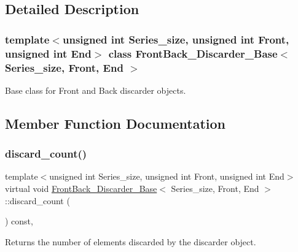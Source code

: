 \subsection{Detailed Description}
\subsubsection*{template$<$unsigned int Series\+\_\+size, unsigned int Front, unsigned int End$>$\newline
class Front\+Back\+\_\+\+Discarder\+\_\+\+Base$<$ Series\+\_\+size, Front, End $>$}

Base class for Front and Back discarder objects. 

\subsection{Member Function Documentation}
\mbox{\label{classFrontBack__Discarder__Base_a3d996834bae795ee0242c0344a2bdfdd}} 
\subsubsection{\texorpdfstring{discard\+\_\+count()}{discard\_count()}}
{\footnotesize\ttfamily template$<$unsigned int Series\+\_\+size, unsigned int Front, unsigned int End$>$ \\
virtual void \hyperlink{classFrontBack__Discarder__Base}{Front\+Back\+\_\+\+Discarder\+\_\+\+Base}$<$ Series\+\_\+size, Front, End $>$\+::discard\+\_\+count (\begin{DoxyParamCaption}{ }\end{DoxyParamCaption}) const\hspace{0.3cm}{\ttfamily [inline]}, {\ttfamily [virtual]}}



Returns the number of elements discarded by the discarder object. 

\mbox{\label{classFrontBack__Discarder__Base_ab8a1d0082f223c31da3c1374c520c4c4}} 
